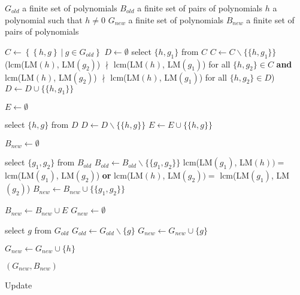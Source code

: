\begin{algorithm}[htp]
  \begin{algorithmic}[1]
    \Require
      \Statex $G_{old}$ a finite set of polynomials
      \Statex $B_{old}$ a finite set of pairs of polynomials
      \Statex $h$ a polynomial such that $h \neq 0$
    \Ensure
      \Statex $G_{new}$ a finite set of polynomials
      \Statex $B_{new}$ a finite set of pairs of polynomials
      \Statex

    \State $C \gets \left\{\left\{h, g\right\}\ |\ g\in G_{old}\right\}$
    \State $D \gets \emptyset$
     \label{alg:update:w1b}
      \State select $\{h,g_1\}$ from $C$
      \State $C \gets C\backslash \{\{h, g_1\}\}$
        \StatexIndent[3](lcm(LM$(h)$, LM$(g_2)$) $\nmid$ lcm(LM$(h)$, LM$(g_1)$) for all $\{h, g_2\}\in C$ \textbf{and}
        \StatexIndent[3]lcm(LM$(h)$, LM$(g_2)$) $\nmid$ lcm(LM$(h)$, LM$(g_1)$) for all $\{h, g_2\} \in D$) \algorithmicthen
        \State $D \gets D \cup \{\{h, g_1\}\}$
      \EndIf
    \EndWhile \label{alg:update:w1e}

    \State $E \gets \emptyset$

     \label{alg:update:w2b}
      \State select $\{h, g\}$ from $D$
      \State $D \gets D\backslash \{\{h, g\}\}$
        \State $E \gets E \cup \{\{h, g\}\}$
      \EndIf
    \EndWhile \label{alg:update:w2e}

    \State $B_{new} \gets \emptyset$

     \label{alg:update:w3b}
      \State select $\{g_1, g_2\}$ from $B_{old}$
      \State $B_{old} \gets B_{old} \backslash \{\{g_1, g_2\}\}$
        \StatexIndent[3]lcm(LM$(g_1)$, LM$(h)) = $ lcm(LM$(g_1)$, LM$(g_2)$) \textbf{or}
        \StatexIndent[3]lcm(LM$(h)$, LM$(g_2)) = $ lcm(LM$(g_1)$, LM$(g_2)$) \algorithmicthen
        \State $B_{new} \gets B_{new} \cup \{\{g_1, g_2\}\}$
      \EndIf
    \EndWhile \label{alg:update:w3e}

    \State $B_{new} \gets B_{new} \cup E$
    \State $G_{new} \gets \emptyset$
    
     \label{alg:update:w4b}
      \State select $g$ from $G_{old}$
      \State $G_{old} \gets G_{old} \backslash \{g\}$
        \State $G_{new} \gets G_{new} \cup \{g\}$
      \EndIf
      \EndWhile \label{alg:update:w4e}

    \State $G_{new} \gets G_{new} \cup \{h\}$

    \State \Return $(G_{new}, B_{new})$

  \end{algorithmic}
  \caption{Update}
  \label{alg:update}
\end{algorithm}
